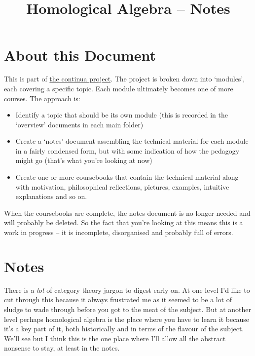 \documentclass[oneside,english]{amsbook}
\numberwithin{section}{chapter}
\theoremstyle{plain}
\theoremstyle{definition}
\begin{document}
	
	\title{Homological Algebra -- Notes}
	
	\maketitle
	
	\tableofcontents
	
	\chapter*{About this Document}
	
	This is part of \href{https://github.com/FineArtMaths/continua}{the continua project}. The project is broken down into `modules', each covering a specific topic. Each module ultimately becomes one of more courses. The approach is:
	
	\begin{itemize}
		\item{Identify a topic that should be its own module (this is recorded in the `overview' documents in each main folder)}
		\item{Create a `notes' document assembling the technical material for each module in a fairly condensed form, but with some indication of how the pedagogy might go (that's what you're looking at now)}
		\item{Create one or more coursebooks that contain the technical material along with motivation, philosophical reflections, pictures, examples, intuitive explanations and so on.}
	\end{itemize}
	
	When the coursebooks are complete, the notes document is no longer needed and will probably be deleted. So the fact that you're looking at this means this is a work in progress -- it is incomplete, disorganised and probably full of errors.

	\chapter*{Notes}
		
		There is a \emph{lot} of category theory jargon to digest early on. At one level I'd like to cut through this because it always frustrated me as it seemed to be a lot of sludge to wade through before you got to the meat of the subject. But at another level perhaps homological algebra is the place where you have to learn it because it's a key part of it, both historically and in terms of the flavour of the subject. We'll see but I think this is the one place where I'll allow all the abstract nonsense to stay, at least in the notes.
		
\end{document}
